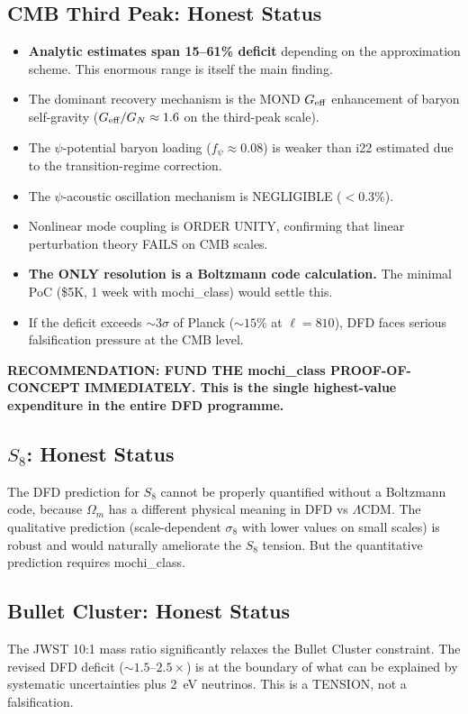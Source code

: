\documentclass[11pt]{article}
\newcommand{\LCDM}{$\Lambda$CDM}
\newcommand{\Geff}{G_{\rm eff}}
\newcommand{\Om}{\Omega_m}
\begin{document}
\subsection{CMB Third Peak: Honest Status}

\begin{tcolorbox}[colback=red!5!white, colframe=red!70!black,
  title=\textbf{CMB THIRD PEAK: HONEST STATUS AT i23}]

\begin{itemize}
\item \textbf{Analytic estimates span 15--61\% deficit} depending on
  the approximation scheme.  This enormous range is itself the main
  finding.
\item The dominant recovery mechanism is the MOND $\Geff$ enhancement
  of baryon self-gravity ($\Geff/G_N \approx 1.6$ on the third-peak
  scale).
\item The $\psi$-potential baryon loading ($f_\psi \approx 0.08$) is
  weaker than i22 estimated due to the transition-regime correction.
\item The $\psi$-acoustic oscillation mechanism is NEGLIGIBLE ($<0.3$\%).
\item Nonlinear mode coupling is ORDER UNITY, confirming that linear
  perturbation theory FAILS on CMB scales.
\item \textbf{The ONLY resolution is a Boltzmann code calculation.}
  The minimal PoC (\$5K, 1 week with mochi\_class) would settle this.
\item If the deficit exceeds $\sim 3\sigma$ of Planck ($\sim 15$\%
  at $\ell = 810$), DFD faces serious falsification pressure at the
  CMB level.
\end{itemize}

\textbf{RECOMMENDATION: FUND THE mochi\_class PROOF-OF-CONCEPT
IMMEDIATELY.  This is the single highest-value expenditure in the
entire DFD programme.}

\end{tcolorbox}

\subsection{$S_8$: Honest Status}

The DFD prediction for $S_8$ cannot be properly quantified without
a Boltzmann code, because $\Om$ has a different physical meaning in
DFD vs \LCDM.  The qualitative prediction (scale-dependent $\sigma_8$
with lower values on small scales) is robust and would naturally
ameliorate the $S_8$ tension.  But the quantitative prediction
requires mochi\_class.

\subsection{Bullet Cluster: Honest Status}

The JWST 10:1 mass ratio significantly relaxes the Bullet Cluster
constraint.  The revised DFD deficit ($\sim 1.5$--$2.5\times$) is at
the boundary of what can be explained by systematic uncertainties plus
2~eV neutrinos.  This is a TENSION, not a falsification.
\end{document}
